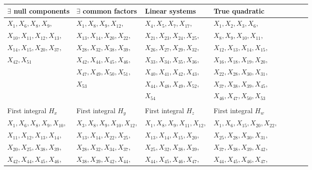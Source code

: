 \documentclass[11pt]{article}
\begin{document}
\begin{center}
\begin{table}[H]
\begin{tabular}{|l|l|l|l|l|l|l|l|}
\hline
$\exists$ null components & $\exists$ common factors & Linear systems & True quadratic \\
\hline
$X_{1},X_{6},X_{8},X_{9},$ &  $X_{1},X_{8},X_{9},X_{12},$ &  $X_{4},X_{5},X_{7},X_{17},$&  $X_{1},X_{2},X_{3},X_{6},$\\


$X_{10},X_{11},X_{12},X_{13},$ & $X_{13},X_{14},X_{20},X_{22},$ & $X_{21},X_{23},X_{24},X_{25},$ &
$X_{8},X_{9},X_{10},X_{11},$\\

$X_{14},X_{15},X_{20},X_{37},$ & $X_{28},X_{32},X_{38},X_{39},$ & $X_{26},X_{27},X_{29},X_{32},$ &
$X_{12},X_{13},X_{14},X_{15},$\\

$X_{42},X_{51}$ & $X_{42},X_{44},X_{45},X_{46},$ & $X_{33},X_{34},X_{35},X_{36},$ &
$X_{16},X_{18},X_{19},X_{20},$\\

 & $X_{47},X_{49},X_{50},X_{51},$ & $X_{40},X_{41},X_{42},X_{43},$ &
$X_{22},X_{28},X_{30},X_{31},$\\

 & $X_{53}$ & $X_{44},X_{48},X_{49},X_{52},$ &
$X_{37},X_{38},X_{39},X_{45},$\\

 & &$X_{54}$ &$X_{46},X_{47},X_{50},X_{53}$\\

 & & & \\

  \hline
  \hline
  First integral $H_x$ & First integral  $H_y$ & First integral $H_z$ & First integral $H_w$\\

  \hline
$X_{1},X_{6},X_{8},X_{9},X_{10},$
 & $X_{3},X_{8},X_{9},X_{10},X_{12},$&
$X_{1},X_{8},X_{9},X_{11},X_{12},$
&  $X_{1},X_{6},X_{15},X_{20},X_{22},$ \\

$X_{11},X_{12},X_{13},X_{14},$
&$X_{13},X_{14},X_{22},X_{25},$
&$X_{13},X_{14},X_{15},X_{20},$
& $X_{25}, X_{28},X_{30},X_{31},$  \\

$X_{20},X_{25},X_{38},X_{39},$
& $X_{28},X_{32}, X_{34},X_{37},$
&$X_{25},X_{32},X_{38},X_{39},$
&$ X_{37},X_{38},X_{39},X_{42},$ \\

$X_{42},X_{44},X_{45},X_{46},$
& $X_{38},X_{39}, X_{42},X_{44},$
&$X_{44},X_{45},X_{46},X_{47},$
&  $X_{44},X_{45},X_{46},X_{47},$\\


\end{tabular}
\end{table}
\end{center}
\end{document}
